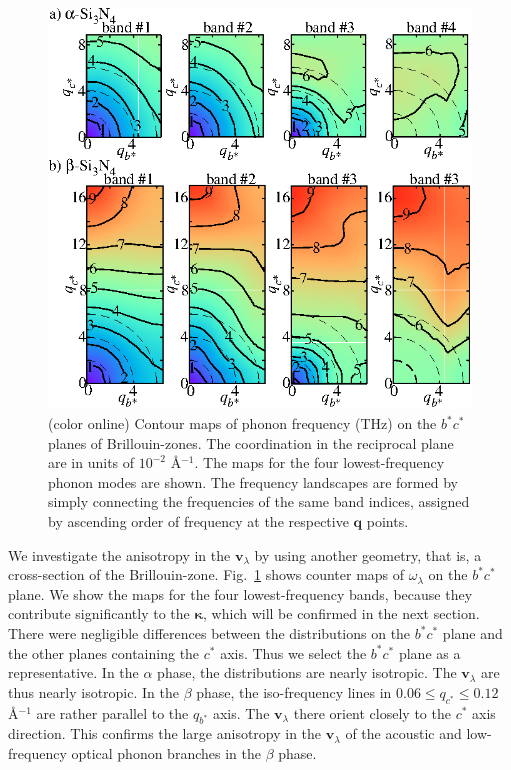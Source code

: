 \documentclass[twocolumn,amsmath,amssymb,a4paper,prb,superscriptaddress,floatfix]{revtex4-1}
\begin{document}
\begin{figure}[ht]
 \centerins
  \includegraphics[width=\linewidth]{Fig2_small.eps} \caption{(color
  online) Contour maps of phonon frequency (THz) on the $b^*c^*$
  planes of Brillouin-zones. The coordination in the reciprocal plane 
   are in units of $10^{-2}$ \AA$^{-1}$. The maps for the four lowest-frequency
  phonon modes are shown. The frequency landscapes are formed by simply
  connecting the frequencies of the same band indices, assigned by
  ascending order of frequency at the respective $\mathbf {q}$
  points. \label{fig:Fig3_338} }
 \centering
\end{figure}

We investigate the anisotropy in the $\mathbf{v}_{\lambda}$ by using another
geometry, that is, a cross-section of the Brillouin-zone.
Fig.~\ref{fig:Fig3_338} shows counter maps of $\omega_{\lambda}$  on the
$b^*c^*$ plane.  We show the maps for the four lowest-frequency bands, because
they contribute significantly to the $\boldsymbol{\kappa}$, which will be
confirmed in the next section. There were negligible differences between the
distributions on the $b^*c^*$ plane and the other planes containing the $c^*$
axis.  Thus we select the $b^*c^*$ plane as a representative.  In the $\alpha$
phase, the distributions are nearly isotropic.  The $\mathbf{v}_{\lambda}$ are
thus nearly isotropic. In the $\beta$ phase, the iso-frequency lines in $0.06
\le q_{c^*} \le 0.12$ \AA$^{-1}$ are rather parallel to the $q_{b^*}$ axis.  The
$\mathbf{v}_{\lambda}$ there orient closely to the $c^*$ axis direction. This
confirms the large anisotropy in the $\mathbf{v}_{\lambda}$ of the acoustic and
low-frequency optical phonon branches in the $\beta$ phase.
\end{document}
